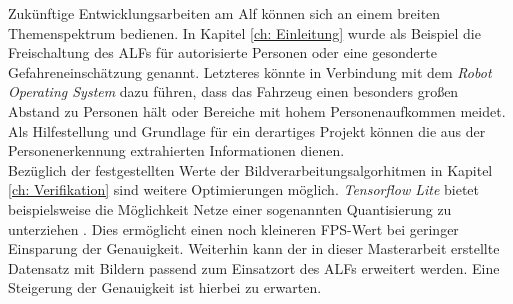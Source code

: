 Zukünftige Entwicklungsarbeiten am Alf können sich an einem breiten Themenspektrum bedienen. In Kapitel \ref{ch: Einleitung} wurde als Beispiel die Freischaltung des ALFs für autorisierte Personen oder eine gesonderte Gefahreneinschätzung genannt. Letzteres könnte in Verbindung mit dem \textit{Robot Operating System} dazu führen, dass das Fahrzeug einen besonders großen Abstand zu Personen hält oder Bereiche mit hohem Personenaufkommen meidet. Als Hilfestellung und Grundlage für ein derartiges Projekt können die aus der Personenerkennung extrahierten Informationen dienen. \\

Bezüglich der festgestellten Werte der Bildverarbeitungsalgorhitmen in Kapitel \ref{ch: Verifikation} sind weitere Optimierungen möglich. \textit{Tensorflow Lite} bietet beispielsweise die Möglichkeit Netze einer sogenannten Quantisierung zu unterziehen \cite{tflite}. Dies ermöglicht einen noch kleineren FPS-Wert bei geringer Einsparung der Genauigkeit. Weiterhin kann der in dieser Masterarbeit erstellte Datensatz mit Bildern passend zum Einsatzort des ALFs erweitert werden. Eine Steigerung der Genauigkeit ist hierbei zu erwarten.\\






